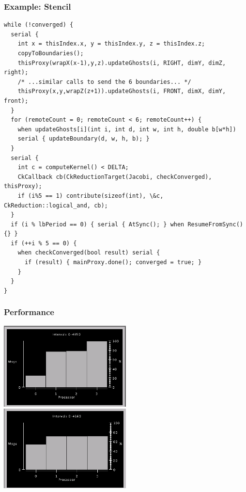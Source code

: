 \begin{frame}[fragile]
\frametitle{Example: Stencil}
\begin{lstlisting}[basicstyle=\tiny]
while (!converged) {
  serial {
    int x = thisIndex.x, y = thisIndex.y, z = thisIndex.z;
    copyToBoundaries();
    thisProxy(wrapX(x-1),y,z).updateGhosts(i, RIGHT, dimY, dimZ, right);
    /* ...similar calls to send the 6 boundaries... */
    thisProxy(x,y,wrapZ(z+1)).updateGhosts(i, FRONT, dimX, dimY, front);
  }
  for (remoteCount = 0; remoteCount < 6; remoteCount++) {
    when updateGhosts[i](int i, int d, int w, int h, double b[w*h])
    serial { updateBoundary(d, w, h, b); }
  }
  serial {
    int c = computeKernel() < DELTA;
    CkCallback cb(CkReductionTarget(Jacobi, checkConverged), thisProxy);
    if (i%5 == 1) contribute(sizeof(int), \&c, CkReduction::logical_and, cb);
  }
  if (i % lbPeriod == 0) { serial { AtSync(); } when ResumeFromSync() {} }
  if (++i % 5 == 0) {
    when checkConverged(bool result) serial {
      if (result) { mainProxy.done(); converged = true; }
    }
  }
}
\end{lstlisting}
\end{frame}

\begin{frame}
\frametitle{Performance}
\begin{centering}
\includegraphics[width=0.5\textwidth]{figures/beforeLB}
\includegraphics[width=0.5\textwidth]{figures/afterLB}
\end{centering}
\end{frame}

